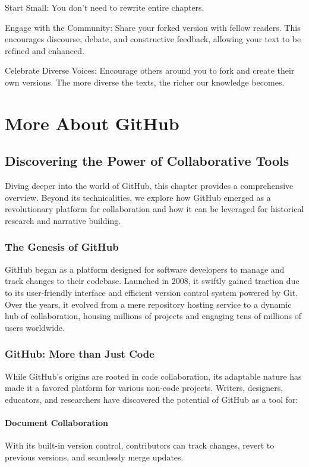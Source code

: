 \documentclass{book}
\begin{document}
Start Small: You don't need to rewrite entire chapters. 

Engage with the Community: Share your forked version with fellow readers. This encourages discourse, debate, and constructive feedback, allowing your text to be refined and enhanced.

Celebrate Diverse Voices: Encourage others around you to fork and create their own versions. The more diverse the texts, the richer our knowledge becomes.

\chapter{More About GitHub}
\section*{Discovering the Power of Collaborative Tools}
Diving deeper into the world of GitHub, this chapter provides a comprehensive overview. Beyond its technicalities, we explore how GitHub emerged as a revolutionary platform for collaboration and how it can be leveraged for historical research and narrative building.

\subsection*{The Genesis of GitHub}
GitHub began as a platform designed for software developers to manage and track changes to their codebase. Launched in 2008, it swiftly gained traction due to its user-friendly interface and efficient version control system powered by Git. Over the years, it evolved from a mere repository hosting service to a dynamic hub of collaboration, housing millions of projects and engaging tens of millions of users worldwide.

\subsection*{GitHub: More than Just Code}
While GitHub's origins are rooted in code collaboration, its adaptable nature has made it a favored platform for various non-code projects. Writers, designers, educators, and researchers have discovered the potential of GitHub as a tool for:

\subsubsection*{Document Collaboration}
With its built-in version control, contributors can track changes, revert to previous versions, and seamlessly merge updates.
\end{document}
